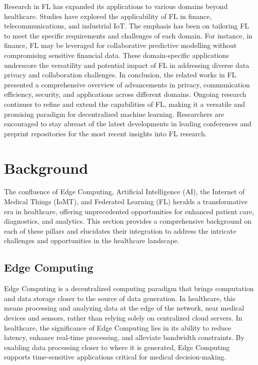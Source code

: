 \documentclass[conference]{IEEEtran}
\begin{document}

Research in FL has expanded its applications to various domains beyond healthcare. Studies have explored the applicability of FL in finance, telecommunications, and industrial IoT. The emphasis has been on tailoring FL to meet the specific requirements and challenges of each domain. For instance, in finance, FL may be leveraged for collaborative predictive modelling without compromising sensitive financial data. These domain-specific applications underscore the versatility and potential impact of FL in addressing diverse data privacy\cite{8} and collaboration challenges. In conclusion, the related works in FL presented a comprehensive overview of advancements in privacy, communication efficiency, security, and applications across different domains. Ongoing research continues to refine and extend the capabilities of FL, making it a versatile and promising paradigm for decentralized machine learning. Researchers are encouraged to stay abreast of the latest developments in leading conferences and preprint repositories for the most recent insights into FL research.

\section{Background}

The confluence of Edge Computing, Artificial Intelligence (AI), the Internet of Medical Things (IoMT), and Federated Learning (FL) heralds a transformative era in healthcare, offering unprecedented opportunities for enhanced patient care, diagnostics, and analytics. This section provides a comprehensive background on each of these pillars and elucidates their integration to address the intricate challenges and opportunities in the healthcare landscape.

\subsection{Edge Computing}

Edge Computing is a decentralized computing paradigm that brings computation and data storage closer to the source of data generation. In healthcare, this means processing and analyzing data at the edge of the network\cite{2,10}, near medical devices and sensors, rather than relying solely on centralized cloud servers. In healthcare, the significance of Edge Computing lies in its ability to reduce latency, enhance real-time processing, and alleviate bandwidth constraints. By enabling data processing closer to where it is generated, Edge Computing supports time-sensitive applications critical for medical decision-making.
\end{document}

